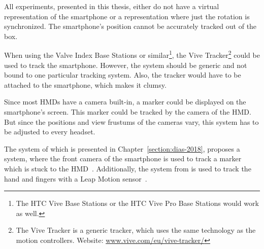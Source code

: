 All experiments, presented in this thesis, either do not have a virtual representation of the smartphone or a representation where just the rotation is synchronized. The smartphone's position cannot be accurately tracked out of the box. 

When using the Valve Index Base Stations or similar\footnote{The HTC Vive Base Stations or the HTC Vive Pro Base Stations would work as well.}, the Vive Tracker\footnote{The Vive Tracker is a generic tracker, which uses the same technology as the motion controllers. Website: \href{https://www.vive.com/eu/vive-tracker/}{www.vive.com/eu/vive-tracker/}} could be used to track the smartphone. However, the system should be generic and not bound to one particular tracking system. Also, the tracker would have to be attached to the smartphone, which makes it clumsy.

Since most \acp{HMD} have a camera built-in, a marker could be displayed on the smartphone's screen. This marker could be tracked by the camera of the \ac{HMD}. But since the positions and view frustums of the cameras vary, this system has to be adjusted to every headset.

The system of \citeauthor{Dias.2018} which is presented in Chapter~\ref{section:dias-2018}, proposes a system, where the front camera of the smartphone is used to track a marker which is stuck to the \ac{HMD}~\cite[4]{Dias.2018}. Additionally, the system from \citeauthor{Afonso.2017} is used to track the hand and fingers with a Leap Motion sensor~\cite[247]{Afonso.2017}.

